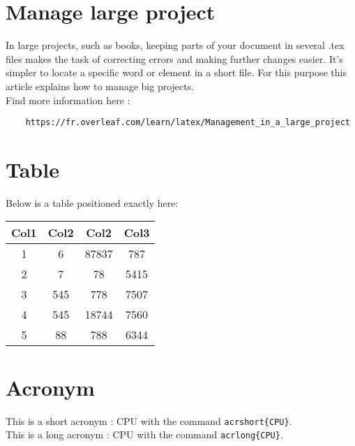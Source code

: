 \section{Manage large project}
In large projects, such as books, keeping parts of your document in several .tex files makes the task of correcting errors and making further changes easier. 
It's simpler to locate a specific word or element in a short file. For this purpose this article explains how to manage big projects. \\
Find more information here :
\begin{lstlisting}
    https://fr.overleaf.com/learn/latex/Management_in_a_large_project
\end{lstlisting}

\section{Table}



Below is a table positioned exactly here:
\begin{table}[H]
    \centering
    \begin{tabular}{||c c c c||}
        \hline
        Col1 & Col2 & Col2  & Col3 \\ [0.5ex]
        \hline\hline
        1    & 6    & 87837 & 787  \\
        2    & 7    & 78    & 5415 \\
        3    & 545  & 778   & 7507 \\
        4    & 545  & 18744 & 7560 \\
        5    & 88   & 788   & 6344 \\ [1ex]
        \hline
    \end{tabular}
\end{table}

\section{Acronym}

This is a short acronym : \acrshort{CPU} with the command \texttt{acrshort\{CPU\}}.\\
This is a long acronym : \acrlong{CPU} with the command \texttt{acrlong\{CPU\}}.


